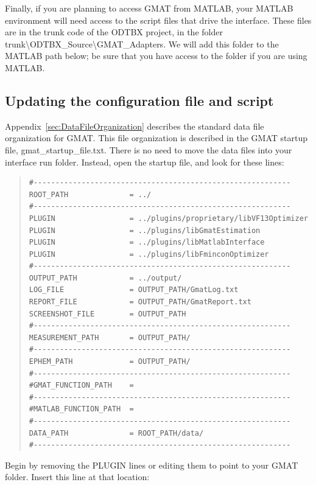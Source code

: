 \documentclass[letterpaper,10pt]{article}
\begin{document}
Finally, if you are planning to access GMAT from MATLAB, your MATLAB environment will need access to the script files that drive the interface.  These files are in the trunk code of the ODTBX project, in the folder trunk{\textbackslash}ODTBX\_Source{\textbackslash}GMAT\_Adapters.  We will add this folder to the MATLAB path below; be sure that you have access to the folder if you are using MATLAB.

\subsection{Updating the configuration file and script}

Appendix~\ref{sec:DataFileOrganization} describes the standard data file organization for GMAT.  This file organization is described in the GMAT startup file, gmat\_startup\_file.txt.  There is no need to move the data files into your interface run folder.  Instead, open the startup file, and look for these lines:

\begin{quote}
\begin{verbatim}
#-----------------------------------------------------------
ROOT_PATH              = ../
#-----------------------------------------------------------
PLUGIN                 = ../plugins/proprietary/libVF13Optimizer
PLUGIN                 = ../plugins/libGmatEstimation
PLUGIN                 = ../plugins/libMatlabInterface
PLUGIN                 = ../plugins/libFminconOptimizer
#-----------------------------------------------------------
OUTPUT_PATH            = ../output/
LOG_FILE               = OUTPUT_PATH/GmatLog.txt
REPORT_FILE            = OUTPUT_PATH/GmatReport.txt
SCREENSHOT_FILE        = OUTPUT_PATH
#-----------------------------------------------------------
MEASUREMENT_PATH       = OUTPUT_PATH/
#-----------------------------------------------------------
EPHEM_PATH             = OUTPUT_PATH/
#-----------------------------------------------------------
#GMAT_FUNCTION_PATH    = 
#-----------------------------------------------------------
#MATLAB_FUNCTION_PATH  = 
#-----------------------------------------------------------
DATA_PATH              = ROOT_PATH/data/
#-----------------------------------------------------------
\end{verbatim}
\end{quote}

Begin by removing the PLUGIN lines or editing them to point to your GMAT folder.  Insert this line at that location:  
\end{document}
